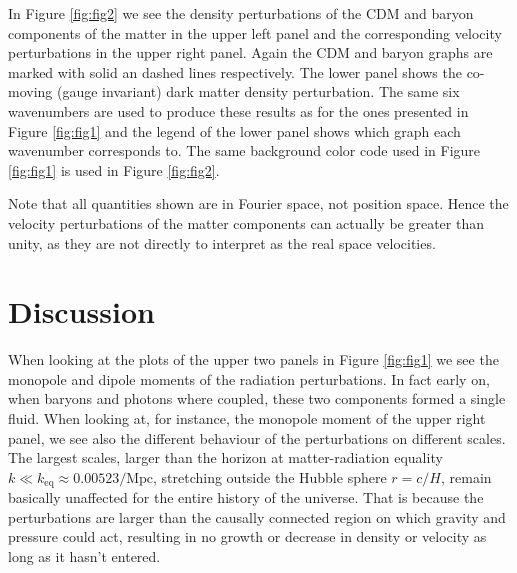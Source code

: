\documentclass[twocolumn]{aastex62}
\begin{document}
In Figure \ref{fig:fig2} we see the density perturbations of the CDM and baryon components of the matter in the upper left panel and the corresponding velocity perturbations in the upper right panel. Again the CDM and baryon graphs are marked with solid an dashed lines respectively. The lower panel shows the co-moving (gauge invariant) dark matter density perturbation. The same six wavenumbers are used to produce these results as for the ones presented in Figure \ref{fig:fig1} and the legend of the lower panel shows which graph each wavenumber corresponds to. The same background color code used in Figure \ref{fig:fig1} is used in Figure \ref{fig:fig2}. 

Note that all quantities shown are in Fourier space, not position space. Hence the velocity perturbations of the matter components can actually be greater than unity, as they are not directly to interpret as the real space velocities.

\section{Discussion}\label{sec:Discussion}
When looking at the plots of the upper two panels in Figure \ref{fig:fig1} we see the monopole and dipole moments of the radiation perturbations. In fact early on, when baryons and photons where coupled, these two components formed a single fluid. When looking at, for instance, the monopole moment of the upper right panel, we see also the different behaviour of the perturbations on different scales. The largest scales, larger than the horizon at matter-radiation equality $k\ll k_\text{eq} \approx 0.00523 /\mathrm{Mpc}$, stretching outside the Hubble sphere $r = c/H$, remain basically unaffected for the entire history of the universe. That is because the perturbations are larger than the causally connected region on which gravity and pressure could act, resulting in no growth or decrease in density or velocity as long as it hasn't entered.
\end{document}
